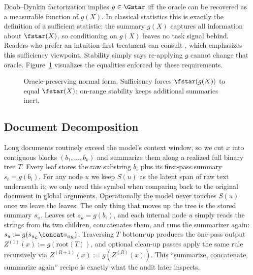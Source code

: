 Doob--Dynkin factorization implies $g\in\Gstar$ iff the oracle can be recovered as a measurable function of $g(X)$. In classical statistics this is exactly the definition of a sufficient statistic: the summary $g(X)$ captures all information about $\fstar(X)$, so conditioning on $g(X)$ leaves no task signal behind. Readers who prefer an intuition-first treatment can consult \citet{doobdynkin-readable}, which emphasizes this sufficiency viewpoint. Stability simply says re-applying $g$ cannot change that oracle. Figure~\ref{fig:gstar} visualizes the equalities enforced by these requirements.

\begin{figure}[t]
    \centering
    \caption{Oracle-preserving normal form. Sufficiency forces $\fstar(g(X))$ to equal $\fstar(X)$; on-range stability keeps additional summaries inert.}
    \label{fig:gstar}
\end{figure}

\subsection{Document Decomposition}

Long documents routinely exceed the model's context window, so we cut $x$ into contiguous blocks $(b_1,\ldots,b_k)$ and summarize them along a realized full binary tree $T$. Every leaf stores the raw substring $b_i$ plus its first-pass summary $s_i=g(b_i)$. For any node $u$ we keep $S(u)$ as the latent span of raw text underneath it; we only need this symbol when comparing back to the original document in global arguments. Operationally the model never touches $S(u)$ once we leave the leaves. The only thing that moves up the tree is the stored summary $s_u$. Leaves set $s_u=g(b_i)$, and each internal node $u$ simply reads the strings from its two children, concatenates them, and runs the summarizer again: $s_u := g(s_{u_L}\concat s_{u_R})$. Traversing $T$ bottom-up produces the one-pass output $Z^{(1)}(x):=g(\text{root}(T))$, and optional clean-up passes apply the same rule recursively via $Z^{(R+1)}(x):=g(Z^{(R)}(x))$. This ``summarize, concatenate, summarize again'' recipe is exactly what the audit later inspects.

